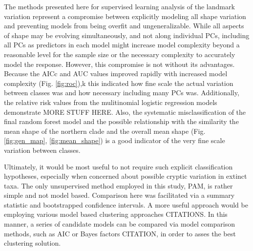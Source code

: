 \documentclass[12pt,letterpaper]{article}\usepackage{graphicx, color}
\begin{document}
The methods presented here for supervised learning analysis of the landmark variation represent a compromise between explicitly modeling all shape variation and preventing models from being overfit and ungeneralizable. While all aspects of shape may be evolving simultaneously, and not along individual PCs, including all PCs as predictors in each model might increase model complexity beyond a reasonable level for the sample size or the necessary complexity to accurately model the response. However, this compromise is not without its advantages. Because the AICc and AUC values improved rapidly with increased model complexity (Fig. \ref{fig:roc}),k this indicated how fine scale the actual variation between classes was and how necessary including many PCs was. Additionally, the relative risk values from the mulitinomial logistic regression models demonstrate MORE STUFF HERE. Also, the systematic misclassification of the final random forest model and the possible relationship with the similarity the mean shape of the northern clade and the overall mean shape (Fig. \ref{fig:gen_map}, \ref{fig:mean_shape}) is a good indicator of the very fine scale variation between classes.

Ultimately, it would be most useful to not require such explicit classification hypotheses, especially when concerned about possible cryptic variation in extinct taxa. The only unsupervised method employed in this study, PAM, is rather simple and not model based. Comparison here was facilitated via a summary statistic and bootstrapped confidence intervals. A more useful approach would be employing various model based clustering approaches CITATIONS. In this manner, a series of candidate models can be compared via model comparison methods, such as AIC or Bayes factors CITATION, in order to asses the best clustering solution.%
\end{document}
